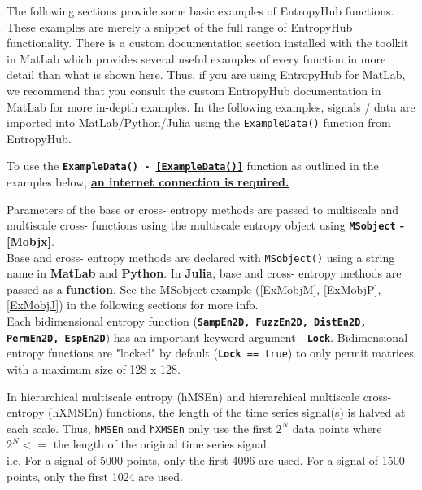 \documentclass[12pt, a4paper, titlepage, openany]{book}
\begin{document}
The following sections provide some basic examples of EntropyHub functions. These examples are \ul{merely a snippet} of the full range of EntropyHub functionality.\newline \newline
\noindent  There is a custom documentation section installed with the toolkit in MatLab which provides several useful examples of every function in more detail than what is shown here.  Thus, if you are using EntropyHub for MatLab, we recommend that you consult the custom EntropyHub documentation in MatLab for more in-depth examples.
\newline \newline
In the following examples, signals / data are imported into MatLab/Python/Julia using the \texttt{ExampleData()} function from EntropyHub.

\begin{tcolorbox}[sharp corners, colback=ehone!10, colframe=ehone, title=\textbf{NOTE}, label={BiBox}]

To use the \texttt{\textbf{ExampleData() - \ref{ExampleData()}}} function as outlined in the examples below, \underline{\textbf{an internet connection is required.}}\\
\end{tcolorbox}

\begin{tcolorbox}[sharp corners, colback=ehone!10, colframe=ehone, title=\textbf{THINGS TO REMEMBER}, label={BiBox}]

Parameters of the base or cross- entropy methods are passed to multiscale and multiscale cross- functions using the multiscale entropy object using \textbf{\texttt{MSobject} - \ref{Mobjx}}.\\
Base and cross- entropy methods are declared with \texttt{MSobject()} using a string name in \textbf{MatLab} and \textbf{Python}. In \textbf{Julia}, base and cross- entropy methods are passed as a \textbf{\underline{function}}. See the MSobject example (\ref{ExMobjM},  \ref{ExMobjP}, \ref{ExMobjJ}) in the following sections for more info.\\
\newline
Each bidimensional entropy function (\texttt{\textbf{SampEn2D, FuzzEn2D, DistEn2D, PermEn2D, EspEn2D}}) has an important keyword argument - \texttt{\textbf{Lock}}. Bidimensional entropy functions are "locked" by default (\texttt{\textbf{Lock} == true}) to only permit matrices with a maximum size of 128 x 128.\\ \newline

In hierarchical multiscale entropy (hMSEn) and hierarchical multiscale cross-entropy (hXMSEn) functions, the length of the time series signal(s) is halved at each scale. Thus, \texttt{hMSEn} and \texttt{hXMSEn} only use the first $2^N$ data points where  $2^N <=$ the length of the original time series signal.\\
i.e. For a signal of 5000 points, only the first 4096 are used. For a signal of 1500 points, only the first 1024 are used.
\end{tcolorbox}
\end{document}
